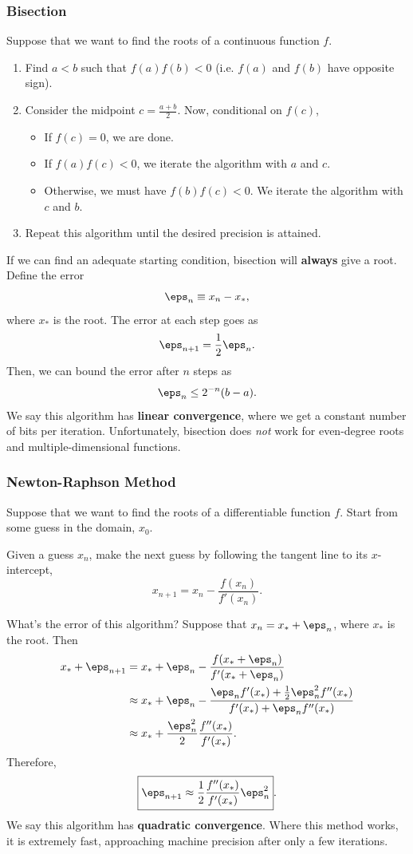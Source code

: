 \documentclass[12pt,letterpaper]{article}
\begin{document}
\subsubsection{Bisection}
\begin{algorithm}[Bisection]
    Suppose that we want to find the roots of a continuous function $f$.
    \begin{enumerate}
        \item Find $a<b$ such that $f(a)f(b)<0$ (i.e. $f(a)$ and $f(b)$ have opposite sign).
        \item Consider the midpoint $c=\frac{a+b}2$. Now, conditional on $f(c)$,
        \begin{itemize}
            \item If $f(c)=0$, we are done.
            \item If $f(a)f(c)<0$, we iterate the algorithm with $a$ and $c$.
            \item Otherwise, we must have $f(b)f(c)<0$. We iterate the algorithm with $c$ and $b$.
        \end{itemize}
        \item Repeat this algorithm until the desired precision is attained.
    \end{enumerate}
\end{algorithm}
If we can find an adequate starting condition, bisection will \textbf{always} give a root. Define the error
\[\eps_n\equiv x_n-x_*,\]
where $x_*$ is the root. The error at each step goes as
\[\eps_{n+1}=\frac12\eps_n.\]
Then, we can bound the error after $n$ steps as
\[\eps_n\leq 2^{-n}(b-a).\]
We say this algorithm has \textbf{linear convergence}, where we get a constant number of bits per iteration. Unfortunately, bisection does \textit{not} work for even-degree roots and multiple-dimensional functions.
\subsubsection{Newton-Raphson Method}
\begin{algorithm}
    Suppose that we want to find the roots of a differentiable function $f$. Start from some guess in the domain, $x_0$.
    
    Given a guess $x_n$, make the next guess by following the tangent line to its $x$-intercept,
    \[x_{n+1}=x_n-\frac{f(x_n)}{f'(x_n)}.\]
\end{algorithm}
What's the error of this algorithm? Suppose that $x_n=x_*+\eps_n$, where $x_*$ is the root. Then
\begin{align*}
    x_*+\eps_{n+1}&=x_*+\eps_n-\frac{f(x_*+\eps_n)}{f'(x_*+\eps_n)}\\
    &\approx x_*+\eps_n-\frac{\eps_nf'(x_*)+\frac12\eps_n^2f''(x_*)}{f'(x_*)+\eps_nf''(x_*)}\\
    &\approx x_*+\frac{\eps_n^2}{2}\frac{f''(x_*)}{f'(x_*)}.
\end{align*}
Therefore,
\[\boxed{\eps_{n+1}\approx\frac12\frac{f''(x_*)}{f'(x_*)}\eps_n^2}.\]
We say this algorithm has \textbf{quadratic convergence}. Where this method works, it is extremely fast, approaching machine precision after only a few iterations.
\end{document}

